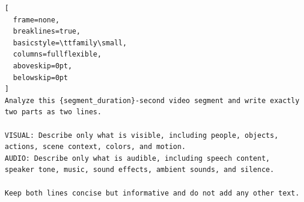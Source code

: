 \begin{tcolorbox}[
  colback=blue!5!white,
  colframe=blue!75!black,
  width=\textwidth,
  arc=1mm,
  boxrule=0.8pt,
  boxsep=1mm,
  title=\textbf{Modality Specific Captioning},
  colbacktitle=blue!75!black,
  coltitle=white,
  fonttitle=\bfseries\sffamily,
  halign title=center,
  top=2mm,
  bottom=2mm,
  left=2mm,
  right=2mm
]
\small
\setlength{\parindent}{0pt}
\begin{lstlisting}[
  frame=none,
  breaklines=true,
  basicstyle=\ttfamily\small,
  columns=fullflexible,
  aboveskip=0pt,
  belowskip=0pt
]
Analyze this {segment_duration}-second video segment and write exactly two parts as two lines.

VISUAL: Describe only what is visible, including people, objects, actions, scene context, colors, and motion.
AUDIO: Describe only what is audible, including speech content, speaker tone, music, sound effects, ambient sounds, and silence.

Keep both lines concise but informative and do not add any other text.
\end{lstlisting}
\end{tcolorbox}